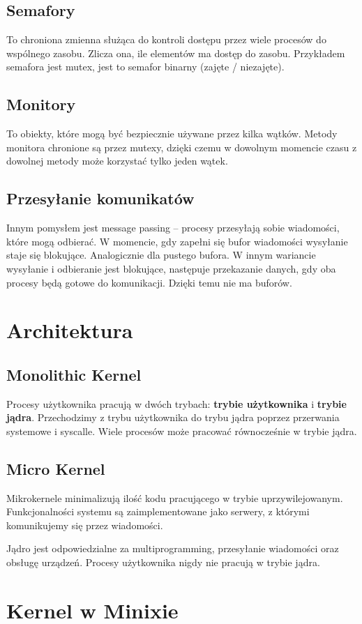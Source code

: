 \subsection{Semafory}
To chroniona zmienna służąca do kontroli dostępu przez wiele procesów do wspólnego zasobu. Zlicza ona, ile elementów ma dostęp do zasobu. Przykładem semafora jest mutex, jest to semafor binarny (zajęte / niezajęte).
\subsection{Monitory}
To obiekty, które mogą być bezpiecznie używane przez kilka wątków. Metody monitora chronione są przez mutexy, dzięki czemu w dowolnym momencie czasu z dowolnej metody może korzystać tylko jeden wątek.
\subsection{Przesyłanie komunikatów}
Innym pomysłem jest message passing -- procesy przesyłają sobie wiadomości, które mogą odbierać. W momencie, gdy zapełni się bufor wiadomości wysyłanie staje się blokujące. Analogicznie dla pustego bufora. W innym wariancie wysyłanie i odbieranie jest blokujące, następuje przekazanie danych, gdy oba procesy będą gotowe do komunikacji. Dzięki temu nie ma buforów.
\section{Architektura}
\subsection{Monolithic Kernel}
Procesy użytkownika pracują w dwóch trybach: \textbf{trybie użytkownika} i \textbf{trybie jądra}. Przechodzimy z trybu użytkownika do trybu jądra poprzez przerwania systemowe i syscalle. Wiele procesów może pracować równocześnie w trybie jądra.
\subsection{Micro Kernel}
Mikrokernele minimalizują ilość kodu pracującego w trybie uprzywilejowanym. Funkcjonalności systemu są zaimplementowane jako serwery, z którymi komunikujemy się przez wiadomości.

Jądro jest odpowiedzialne za multiprogramming, przesyłanie wiadomości oraz obsługę urządzeń. Procesy użytkownika nigdy nie pracują w trybie jądra.
\section{Kernel w Minixie}
